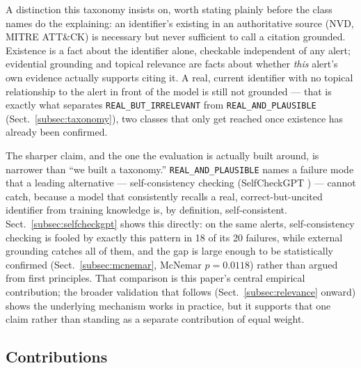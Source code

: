 \documentclass[pdflatex,sn-mathphys-num]{sn-jnl}%
\begin{document}
A distinction this taxonomy insists on, worth stating plainly before the
class names do the explaining: an identifier's existing in an
authoritative source (NVD, MITRE ATT\&CK) is necessary but never
sufficient to call a citation grounded. Existence is a fact about the
identifier alone, checkable independent of any alert; evidential
grounding and topical relevance are facts about whether \textit{this}
alert's own evidence actually supports citing it. A real, current
identifier with no topical relationship to the alert in front of the
model is still not grounded --- that is exactly what separates
\texttt{REAL\_BUT\_IRRELEVANT} from \texttt{REAL\_AND\_PLAUSIBLE}
(Sect.~\ref{subsec:taxonomy}), two classes that only get reached once
existence has already been confirmed.

The sharper claim, and the one the evaluation is actually built around,
is narrower than ``we built a taxonomy.'' \texttt{REAL\_AND\_PLAUSIBLE}
names a failure mode that a leading alternative --- self-consistency
checking (SelfCheckGPT \cite{selfcheckgpt2023}) --- cannot catch, because
a model that consistently recalls a real, correct-but-uncited identifier
from training knowledge is, by definition, self-consistent.
Sect.~\ref{subsec:selfcheckgpt} shows this directly: on the same alerts,
self-consistency checking is fooled by exactly this pattern in 18 of its
20 failures, while external grounding catches all of them, and the gap
is large enough to be statistically confirmed
(Sect.~\ref{subsec:mcnemar}, McNemar $p=0.0118$) rather than argued from
first principles. That comparison is this paper's central empirical
contribution; the broader validation that follows
(Sect.~\ref{subsec:relevance} onward) shows the underlying mechanism
works in practice, but it supports that one claim rather than standing
as a separate contribution of equal weight.

\subsection{Contributions}\label{subsec:contributions}
\end{document}
